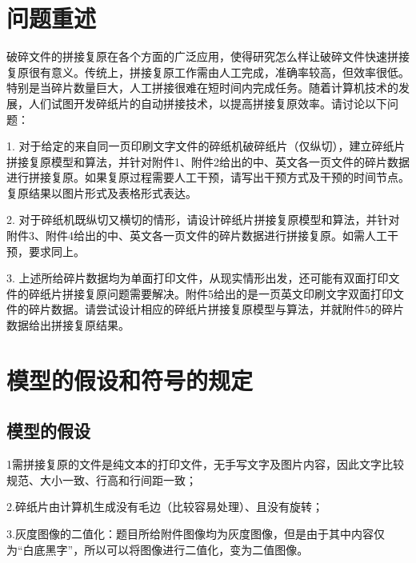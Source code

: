 \documentclass[12pt]{article}
\begin{document}
   {
        {\centering\section{问题重述}}
       {破碎文件的拼接复原在各个方面的广泛应用，使得研究怎么样让破碎文件快速拼接复原很有意义。传统上，拼接复原工作需由人工完成，准确率较高，但效率很低。特别是当碎片数量巨大，人工拼接很难在短时间内完成任务。随着计算机技术的发展，人们试图开发碎纸片的自动拼接技术，以提高拼接复原效率。请讨论以下问题：
       \par 1. 对于给定的来自同一页印刷文字文件的碎纸机破碎纸片（仅纵切），建立碎纸片拼接复原模型和算法，并针对附件1、附件2给出的中、英文各一页文件的碎片数据进行拼接复原。如果复原过程需要人工干预，请写出干预方式及干预的时间节点。复原结果以图片形式及表格形式表达。
       \par 2. 对于碎纸机既纵切又横切的情形，请设计碎纸片拼接复原模型和算法，并针对附件3、附件4给出的中、英文各一页文件的碎片数据进行拼接复原。如需人工干预，要求同上。
       \par 3. 上述所给碎片数据均为单面打印文件，从现实情形出发，还可能有双面打印文件的碎纸片拼接复原问题需要解决。附件5给出的是一页英文印刷文字双面打印文件的碎片数据。请尝试设计相应的碎纸片拼接复原模型与算法，并就附件5的碎片数据给出拼接复原结果。
         }

       {\centering\section{模型的假设和符号的规定}}
       \subsection{模型的假设}
       \par 1需拼接复原的文件是纯文本的打印文件，无手写文字及图片内容，因此文字比较规范、大小一致、行高和行间距一致；
\par 2.碎纸片由计算机生成没有毛边（比较容易处理）、且没有旋转；
\par 3.灰度图像的二值化：题目所给附件图像均为灰度图像，但是由于其中内容仅为“白底黑字”，所以可以将图像进行二值化，变为二值图像。


}
\end{document}
